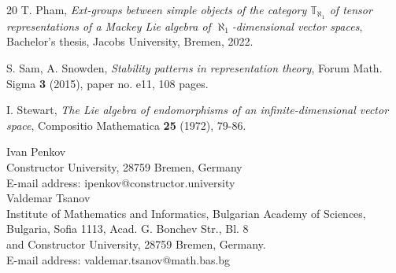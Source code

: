 \documentclass[12pt]{article}
\def\TT {{\mathbb T}}     %
\begin{document}
{\begin{thebibliography}{20}
 T. Pham, {\it Ext-groups between simple objects of the category $\TT_{\aleph_1}$ of tensor representations of a Mackey Lie algebra of $\aleph_1$-dimensional vector spaces}, Bachelor's thesis, Jacobs University, Bremen, 2022.

 S. Sam, A. Snowden, {\it Stability patterns in representation theory}, Forum Math. Sigma {\bf 3} (2015), paper no. e11, 108 pages.

 I. Stewart, {\it The Lie algebra of endomorphisms of an infinite-dimensional vector space}, Compositio Mathematica {\bf 25} (1972), 79-86.

\end{thebibliography}
}


\noindent Ivan Penkov\\
Constructor University, 28759 Bremen, Germany\\
E-mail address: ipenkov@constructor.university\\

\noindent Valdemar Tsanov\\
Institute of Mathematics and Informatics, Bulgarian Academy of Sciences,\\
Bulgaria, Sofia 1113, Acad. G. Bonchev Str., Bl. 8\\
and Constructor University, 28759 Bremen, Germany.\\
E-mail address: valdemar.tsanov@math.bas.bg\\
\end{document}
